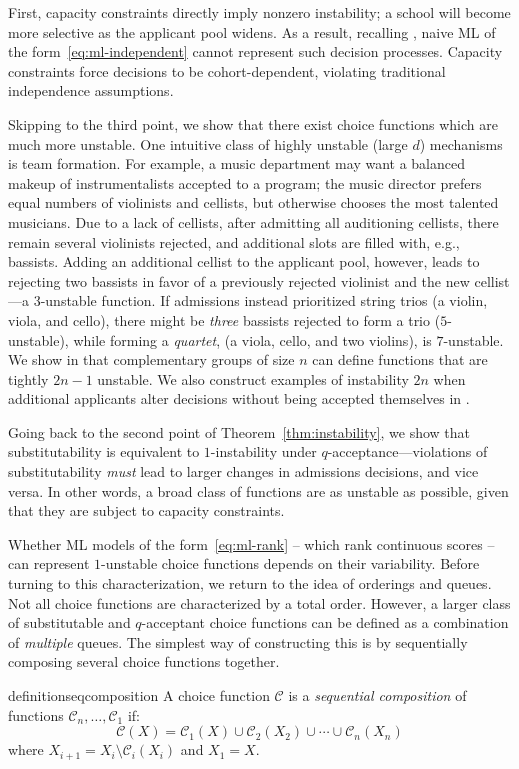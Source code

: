 \documentclass[letterpaper]{article}
\newcommand{\choice}{\mathcal{C}}
\begin{document}
First, capacity constraints directly imply nonzero instability; a school will become more selective as the applicant pool widens.
As a result, recalling , naive ML of the form~\eqref{eq:ml-independent} cannot represent such decision processes.
Capacity constraints force decisions to be cohort-dependent, violating traditional independence assumptions.

Skipping to the third point, we show that there exist choice functions which are much more unstable.
One intuitive class of highly unstable (large $d$) mechanisms is team formation. For example, a music department may want a balanced makeup of instrumentalists accepted to a program; the music director prefers equal numbers of violinists and cellists, but otherwise chooses the most talented musicians. Due to a lack of cellists, after admitting all auditioning cellists, there remain several violinists rejected, and additional slots are filled with, e.g., bassists. Adding an additional cellist to the applicant pool, however, leads to rejecting two bassists in favor of a previously rejected violinist and the new cellist---a $3$-unstable function.
If admissions instead prioritized string trios (a violin, viola, and cello), there might be \textit{three} bassists rejected to form a trio ($5$-unstable), while forming a \textit{quartet}, (a viola, cello, and two violins), is $7$-unstable. We show in  that complementary groups of size $n$ can define functions that are tightly $2n-1$ unstable.
We also construct examples of instability $2n$ when additional applicants alter decisions without being accepted themselves in .

Going back to the second point of Theorem~\ref{thm:instability}, we show that substitutability is equivalent to $1$-instability under $q$-acceptance---violations of substitutability \textit{must} lead to larger changes in admissions decisions, and vice versa. In other words, a broad class of functions are as unstable as possible, given that they are subject to capacity constraints.

Whether ML models of the form~\eqref{eq:ml-rank} -- which rank continuous scores -- can represent $1$-unstable choice functions depends on their variability.
Before turning to this characterization, we return to the idea of orderings and queues.
Not all choice functions are characterized by a total order.
However, a larger class of substitutable and $q$-acceptant choice functions can be defined as a combination of \textit{multiple} queues.
The simplest way of constructing this is by sequentially composing several choice functions together.
\begin{restatable}{definition}{seqcomposition} \label{def:seq-composition}
A choice function $\choice$ is a \textit{sequential composition} of functions $\choice_n, \ldots, \choice_1$ if:
$$\choice(X) = \choice_1(X) \cup \choice_{2}(X_{2}) \cup \cdots \cup \choice_n(X_n)$$
where $X_{i+1}= X_{i} \setminus \choice_{i}(X_{i})$ and $X_1 = X$.
\end{restatable}
\end{document}
